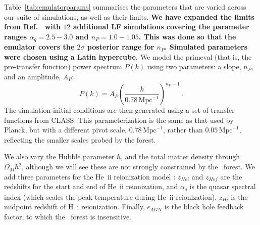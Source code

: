 Table~\ref{tab:emulatorparams} summarises the parameters that are varied across our suite of simulations, as well as their limits. \textbf{We have expanded the limits from Ref.~\cite{2023simsuite} with $12$ additional LF simulations covering the parameter ranges $\alpha_q = 2.5 - 3.0$ and $n_P = 1.0 - 1.05$. This was done so that the emulator covers the $2\sigma$ posterior range for $n_P$. Simulated parameters were chosen using a Latin hypercube.}
We model the primeval (that is, the pre-transfer function) power spectrum $P(k)$  using two parameters: a slope, $n_P$, and an amplitude, $A_P$:
\begin{equation}
    P(k) = A_P \left(\frac{k}{0.78\, \mathrm{Mpc}^{-1}}\right)^{n_P - 1}\,.
\end{equation}
The simulation initial conditions are then generated using a set of transfer functions from CLASS. This parameterization is the same as that used by Planck, but with a different pivot scale, $0.78\, \mathrm{Mpc}^{-1}$, rather than $0.05 \,\mathrm{Mpc}^{-1}$, reflecting the smaller scales probed by the forest.

We also vary the Hubble parameter $h$, and the total matter density through $\Omega_M h^2$, although we will see these are not strongly constrained by the \Lya~forest.
We add three parameters for the He~{\sc ii} reionization model \cite{2020MNRAS.496.4372U}: $z_{Hei}$ and $z_{Hef}$ are the redshifts for the start and end of He~{\sc ii} reionization, and $\alpha_q$ is the quasar spectral index (which scales the peak temperature during He~{\sc ii} reionization).
$z_{Hi}$ is the midpoint redshift of H~{\sc i} reionization.
Finally, $\epsilon_{AGN}$ is the black hole feedback factor, to which the \Lya~forest is insensitive.

